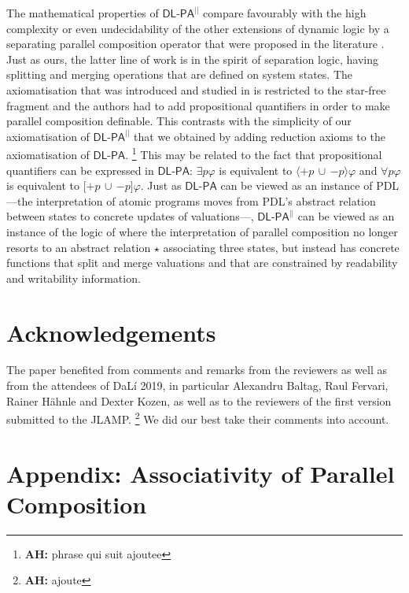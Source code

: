\documentclass{llncs}
\newcommand{\pll}{ {||} }							%
\newcommand{\Dlpa}{\ensuremath{\mathsf{DL\text{-}PA}}\xspace}
\newcommand{\DlpaPll}{\ensuremath{\mathsf{DL\text{-}PA}^\pll}\xspace}
\newcommand{\ah}[1]{\footnote{\textbf{AH:} #1}}
\newcommand{\assgntopV}[1]{{\mathtt {+} #1}}
\newcommand{\assgnbotV}[1]{{\mathtt {-} #1}}
\newcommand{\lbox}[1]{ \big[ #1 \big] }
\newcommand{\ldia}[1]{ \big\langle #1 \big\rangle}
\newcommand{\ndet}{\,{\cup}\,}
\renewcommand{\phi}{\varphi}
\begin{document}
The mathematical properties of \DlpaPll compare favourably with 
the high complexity or even undecidability of the 
other extensions of dynamic logic by a separating parallel composition operator that were proposed in the literature
\cite{BalbianiT14,Boudou16}.
Just as ours, the latter line of work is in the spirit of separation logic, having splitting and merging operations that are defined on system states. 
The axiomatisation that was introduced and studied in \cite{DBLP:journals/logcom/BalbianiB18} is restricted to the star-free fragment and the authors had to add propositional quantifiers in order to make parallel composition definable. 
This contrasts with the simplicity of our axiomatisation of \DlpaPll that we obtained by adding reduction axioms to the axiomatisation of \Dlpa. 
\ah{
phrase qui suit ajoutee
}
This may be related to the fact that propositional quantifiers can be expressed in \Dlpa: 
$\exists p \phi$ is equivalent to $\ldia{ \assgntopV p \ndet \assgnbotV p } \phi$ and 
$\forall p \phi$ is equivalent to $\lbox{ \assgntopV p \ndet \assgnbotV p } \phi$.
Just as \Dlpa can be viewed as an instance of PDL%
---the interpretation of atomic programs moves from PDL's abstract relation between states to concrete updates of valuations\mbox{---,}
\DlpaPll can be viewed as an instance of the logic of \cite{DBLP:journals/entcs/BenevidesFV11}
where the interpretation of parallel composition no longer resorts to
an abstract relation $\star$ associating three states, 
but instead has concrete functions that split and merge valuations and that are constrained by readability and writability information. 



\section{Acknowledgements}
The paper benefited from comments and remarks from the reviewers as well as from the attendees of DaL\'i 2019, 
in particular Alexandru Baltag, Raul Fervari, Rainer H\"ahnle and Dexter Kozen, as well as 
to the reviewers of the first version submitted to the JLAMP.
\ah{
ajoute
}
We did our best take their comments into account. 


\appendix
\section{Appendix: Associativity of Parallel Composition}


%


\end{document}
